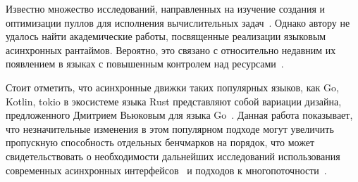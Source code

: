 Известно множество исследований, направленных на изучение создания и оптимизации пуллов для исполнения вычислительных задач~\cite{ThreadPoolSize, PerfDeviationsInThreadPools, SyncInThreadPools, ProduserConsumerThreadPool}. Однако автору не удалось найти академические работы, посвященные реализации языковым асинхронных рантаймов. Вероятно, это связано с относительно недавним их появлением в языках с повышенным контролем над ресурсами~\cite{CPPCoroutinesDesignAndImpl}.

Стоит отметить, что асинхронные движки таких популярных языков, как Go, Kotlin, tokio в экосистеме языка Rust представляют собой вариации дизайна, предложенного Дмитрием Вьюковым для языка Go~\cite{GoScheduler, GoSchedulerImpropvements}. Данная работа показывает, что незначительные изменения в этом популярном подходе могут увеличить пропускную способность отдельных бенчмарков на порядок, что может свидетельствовать о необходимости дальнейших исследований использования современных асинхронных интерфейсов~\cite{ModernStorageAPI} и подходов к многопоточности~\cite{ThreadPerCore}.

